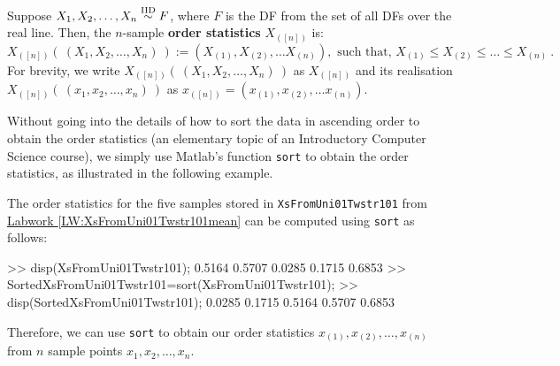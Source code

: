 \begin{definition}
Suppose $X_1,X_2,\ldots,X_n \overset{{\rm IID}}{\sim} F$, where $F$ is the DF from the set of all DFs over the real line.  Then, the $n$-sample {\bf order statistics} $X_{([n])}$ is:
\begin{equation}\label{E:OrderStatistics}
X_{([n])}( \ (X_1,X_2,\ldots,X_n) \ ) := \left(  X_{(1)},X_{(2)}, \ldots X_{(n)} \right), \text{ such that, }
 X_{(1)} \leq X_{(2)} \leq \ldots \leq X_{(n)}  \ .
\end{equation}
For brevity, we write $X_{([n])}( \ (X_1,X_2,\ldots,X_n) \ )$ as $X_{([n])}$ and its realisation $X_{([n])}( \ (x_1,x_2,\ldots,x_n) \ )$ as $x_{([n])} = (  x_{(1)},x_{(2)}, \ldots x_{(n)} )$.
\end{definition}
Without going into the details of how to sort the data in ascending order to obtain the order statistics (an elementary topic of an Introductory Computer Science course), we simply use {\sc Matlab}'s function {\tt sort} to obtain the order statistics, as illustrated in the following example.
\begin{labwork}\label{LW:SortedXsFromUni01Twstr101}
The order statistics for the five samples stored in {\tt XsFromUni01Twstr101} from \hyperref[LW:XsFromUni01Twstr101mean]{Labwork \ref*{LW:XsFromUni01Twstr101mean}} can be computed using {\tt sort} as follows:
\begin{VrbM}
>> disp(XsFromUni01Twstr101); %
    0.5164    0.5707    0.0285    0.1715    0.6853
>> SortedXsFromUni01Twstr101=sort(XsFromUni01Twstr101); %
>> disp(SortedXsFromUni01Twstr101); %
    0.0285    0.1715    0.5164    0.5707    0.6853
\end{VrbM}
Therefore, we can use {\tt sort} to obtain our order statistics $x_{(1)},x_{(2)},\ldots,x_{(n)}$ from $n$ sample points $x_1,x_2,\ldots,x_n$.
\end{labwork}

